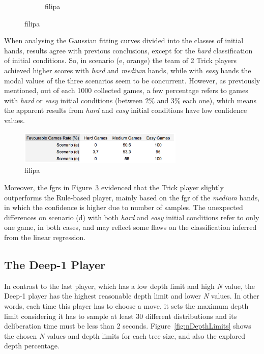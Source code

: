 \begin{figure}[h]
\begin{subfigure}[h]{0.32\textwidth}
                \caption{filipa}
                \label{fig:ADEeasy}
        \end{subfigure}
        \caption{filipa}
        \label{fig:ADE-CH}
\end{figure}

When analysing the Gaussian fitting curves divided into the classes of initial hands, results agree with previous conclusions, except for the \emph{hard} classification of initial conditions.
So, in scenario (e, orange) the team of 2 Trick players achieved higher scores with \emph{hard} and \emph{medium} hands, while with \emph{easy} hands the modal values of the three scenarios seem to be concurrent.
However, as previously mentioned, out of each 1000 collected games, a few percentage refers to games with \emph{hard} or \emph{easy} initial conditions (between 2\% and 3\% each one), which means the apparent results from \emph{hard} and \emph{easy} initial conditions have low confidence values.

\begin{figure}[h!]
  \centering
    \includegraphics[width=0.7\textwidth]{./img/4/ADE-fgr}
  \caption{filipa}
\label{fig:ADE-fgr}
\end{figure}

Moreover, the \acp{fgr} in Figure~\ref{fig:ADE-fgr} evidenced that the Trick player slightly outperforms the Rule-based player, mainly based on the \ac{fgr} of the \emph{medium} hands, in which the confidence is higher due to number of samples.
The unexpected differences on scenario (d) with both \emph{hard} and \emph{easy} initial conditions refer to only one game, in both cases, and may reflect some flaws on the classification inferred from the linear regression.



\subsection{The Deep-1 Player}

In contrast to the last player, which has a low depth limit and high \emph{N} value, the Deep-1 player has the highest reasonable depth limit and lower \emph{N} values.
In other words, each time this player has to choose a move, it sets the maximum depth limit considering it has to sample at least 30 different distributions and its deliberation time must be less than 2 seconds.
Figure~\ref{fig:nDepthLimits} shows the chosen \emph{N} values and depth limits for each tree size, and also the explored depth percentage.

